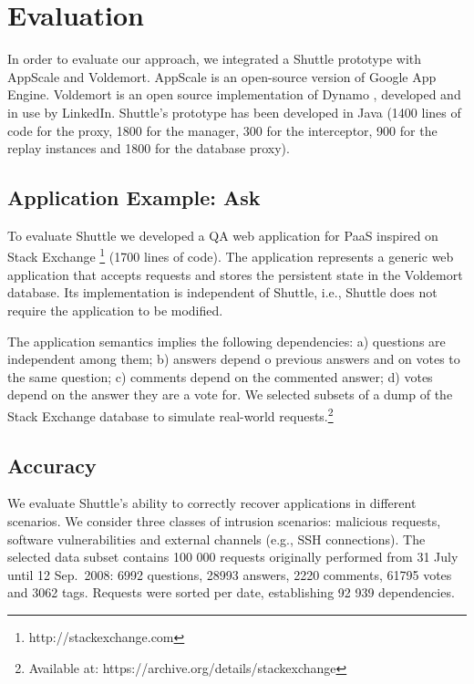 
\section{Evaluation}
\label{sec:evaluation}

In order to evaluate our approach, we integrated a Shuttle prototype with AppScale and Voldemort. AppScale \cite{Appscale} is an open-source version of Google App Engine. Voldemort \cite{Kreps} is an open source implementation of Dynamo \cite{Decandia2007}, developed and in use by LinkedIn. Shuttle’s prototype has been developed in Java (1400 lines of code for the proxy, 1800 for the manager, 300 for the interceptor, 900 for the replay instances and 1800 for the database proxy).


\subsection{Application Example: Ask}
\label{sec:evaluation:app}

To evaluate Shuttle we developed a \acf{QA} web application for \ac{PaaS} inspired on Stack Exchange \footnote{http://stackexchange.com} (1700 lines of code). The application represents a generic web application that accepts requests and stores the persistent state in the Voldemort database. Its implementation is independent of Shuttle, i.e., Shuttle does not require the application to be modified. 

The application semantics implies the following dependencies: a) questions are independent among them; b) answers depend o previous answers and on votes to the same question; c) comments depend on the commented answer; d) votes depend on the answer they are a vote for. We selected subsets of a dump of the Stack Exchange database to simulate real-world requests.\footnote{Available at: https://archive.org/details/stackexchange} 

\subsection{Accuracy}
\label{sec:evaluation:accuracy}

We evaluate Shuttle's ability to correctly recover applications in different scenarios. We consider three classes of intrusion scenarios: malicious requests, software vulnerabilities and external channels (e.g., SSH connections). The selected data subset contains 100 000 requests originally performed from 31 July until 12 Sep.~2008: 6992 questions, 28993 answers, 2220 comments, 61795 votes and 3062 tags. Requests were sorted per date, establishing 92 939 dependencies.

